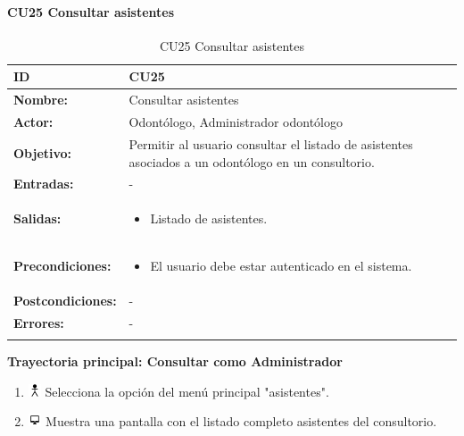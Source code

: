 
\paragraph{CU25 Consultar asistentes}

\begin{longtable}[H]{|p{}|p{12cm}|}
\hline\textbf{ID}         
& \textbf{CU25}            \\ \hline
\textbf{Nombre:}          
& Consultar asistentes      \\ \hline
\textbf{Actor:}          
& Odontólogo, Administrador odontólogo   \\ \hline
\textbf{Objetivo:}       
& Permitir al usuario consultar el listado de asistentes asociados a un odontólogo en un consultorio.\\ \hline
\textbf{Entradas:}  &   -
\\ \hline
\textbf{Salidas:}  &             
\begin{itemize}[nosep]
\item Listado de asistentes.
\end{itemize}
\\ \hline
\textbf{Precondiciones:}  &             
\begin{itemize}[nosep]
\item El usuario debe estar autenticado en el sistema.
\end{itemize}
\\ \hline
\textbf{Postcondiciones:} &  -
\\ \hline
\textbf{Errores:} &  -
\\ \hline
\caption{CU25 Consultar asistentes}
\label{table:1}
\end{longtable}

\textbf{Trayectoria principal: Consultar como Administrador}
\begin{enumerate}
\item \includegraphics[height=1em]{pictures/actor.png} Selecciona la opción del menú principal "asistentes".
\item \includegraphics[height=1em]{pictures/sistema.png} Muestra una pantalla con el listado completo asistentes del consultorio.
\end{enumerate} \bigskip

